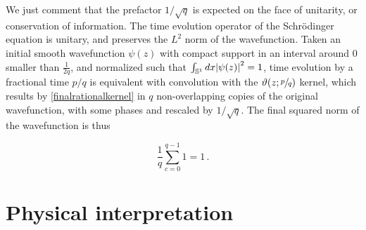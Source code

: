 \documentclass{article}
\newcommand{\T}{\ensuremath{\vartheta}}
\newcommand{\sumZ}{\sum_{n=-\infty}^{\infty}}
\begin{document}
We just comment that the prefactor $1/\sqrt{q}$ is expected on the face of unitarity, or conservation of information. The time evolution operator of the Schr\"odinger equation is unitary, and preserves the $L^2$ norm of the wavefunction. Taken an initial smooth wavefunction $\psi(z)$ with compact support in an interval around $0$ smaller than $\frac{1}{2q}$, and normalized such that $\int_{\mathbb{S}^1} dx \abs{\psi(z)}^2 = 1$, time evolution by a fractional time $p/q$ is equivalent with convolution with the $\vartheta(z;\sfrac{p}{q})$ kernel, which results by \eqref{finalrationalkernel} in $q$ non-overlapping copies of the original wavefunction, with some phases and rescaled by $1/\sqrt{q}$. The final squared norm of the wavefunction is thus

\begin{equation}
    \frac{1}{q}\sum_{c=0}^{q-1} 1 = 1\,.
\end{equation}

%
%
%
%
%


\section{Physical interpretation}
\end{document}
